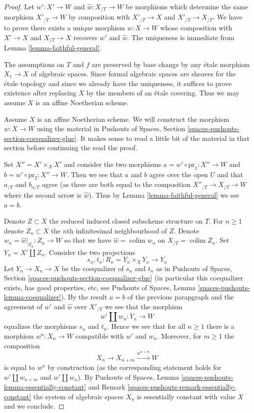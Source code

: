 \documentclass[10pt,a4paper]{amsart}
\theoremstyle{plain}
\theoremstyle{definition}
\theoremstyle{remark}
\numberwithin{equation}{subsection}
\def\colim{\mathop{\mathrm{colim}}\nolimits}
\begin{document}
\begin{proof}
Let $w' : X' \to W$ and $\hat w : X_{/T} \to W$ be morphisms
which determine the same morphism $X'_{/T} \to W$ by composition
with $X'_{/T} \to X$ and $X'_{/T} \to X_{/T}$. We have to prove
there exists a unique morphism $w : X \to W$ whose composition
with $X' \to X$ and $X_{/T} \to X$ recovers $w'$ and $\hat w$.
The uniqueness is immediate from Lemma \ref{lemma-faithful-general}.

\medskip\noindent
The assumptions on $T$ and $f$ are preserved by base change
by any \'etale morphism $X_1 \to X$ of algebraic spaces.
Since formal algebraic spaces are sheaves for the
\'etale topology and since we already have the uniqueness,
it suffices to prove existence after replacing $X$ by
the members of an \'etale covering. Thus we may assume $X$ is
an affine Noetherian scheme.

\medskip\noindent
Assume $X$ is an affine Noetherian scheme. We will construct
the morphism $w : X \to W$ using the material in
Pushouts of Spaces, Section \ref{spaces-pushouts-section-coequalizer-glue}.
It makes sense to read a little bit of the material
in that section before continuing the read the proof.

\medskip\noindent
Set $X'' = X' \times_X X'$ and consider the two morphisms
$a = w' \circ \text{pr}_1 : X'' \to W$ and 
$b = w' \circ \text{pr}_2 : X'' \to W$.
Then we see that $a$ and $b$ agree over the open $U$
and that $a_{/T}$ and $b_{a/T}$ agree (as these are
both equal to the composition $X''_{/T} \to X_{/T} \to W$
where the second arrow is $\hat w$).
Thus by Lemma \ref{lemma-faithful-general}
we see $a = b$.

\medskip\noindent
Denote $Z \subset X$ the reduced induced closed subscheme structure
on $T$. For $n \geq 1$ denote $Z_n \subset X$ the $n$th infinitesimal
neighbourhood of $Z$. Denote $w_n = \hat w|_{Z_n} : Z_n \to W$
so that we have $\hat w = \colim w_n$ on $X_{/T} = \colim Z_n$.
Set $Y_n = X' \amalg Z_n$. Consider the two projections
$$
s_n, t_n : R_n = Y_n \times_X Y_n \longrightarrow Y_n
$$
Let $Y_n \to X_n \to X$ be the coequalizer of $s_n$ and $t_n$ as in
Pushouts of Spaces, Section \ref{spaces-pushouts-section-coequalizer-glue}
(in particular this coequalizer exists, has good properties, etc, see
Pushouts of Spaces, Lemma \ref{spaces-pushouts-lemma-coequalizer}).
By the result $a = b$ of the previous parapgraph and the agreement
of $w'$ and $\hat w$ over $X'_{/T}$ we see that the morphism
$$
w' \amalg w_n : Y_n \longrightarrow W
$$
equalizes the morphisms $s_n$ and $t_n$. Hence we see that for all $n \geq 1$
there is a morphism $w^n : X_n \to W$ compatible with $w'$ and $w_n$.
Moreover, for $m \geq 1$ the composition
$$
X_n \to X_{n + m} \xrightarrow{w^{n + m}} W
$$
is equal to $w^n$ by construction (as the corresponding statement holds
for $w' \amalg w_{n + m}$ and $w' \amalg w_n$). By
Pushouts of Spaces, Lemma
\ref{spaces-pushouts-lemma-essentially-constant} and
Remark \ref{spaces-pushouts-remark-essentially-constant}
the system of algebraic spaces $X_n$ is essentially constant
with value $X$ and we conclude.
\end{proof}
\end{document}

